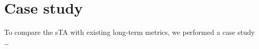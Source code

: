 
\section{Case study}
\label{sec:case-study}

To compare the sTA with existing long-term metrics, we performed a case study …






